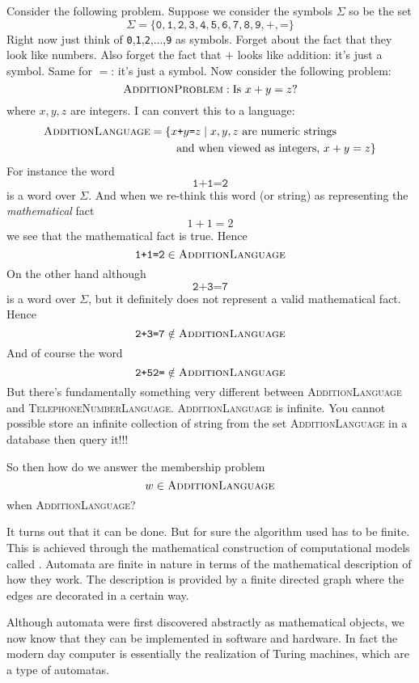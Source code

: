 Consider the following problem.
Suppose we consider the symbols $\Sigma$ so be the set
\[
\Sigma = \{\texttt{0},\texttt{1},\texttt{2},\texttt{3},\texttt{4},\texttt{5},\texttt{6},\texttt{7},\texttt{8},\texttt{9},\texttt{+},\texttt{=}\}
\]
Right now just think of
\verb!0!,\verb!1!,\verb!2!,...,\verb!9! as symbols.
Forget about the fact that they look like numbers.
Also forget the fact that $+$ looks like addition: it's just a symbol.
Same for $=$: it's just a symbol.
Now consider the following problem:
\[
\textsc{AdditionProblem}: \text{Is $x + y = z$?}
\]
where $x,y,z$ are integers.
I can convert this to a language:
\begin{align*}
  \textsc{AdditionLanguage}
  &= \{x\texttt{+}y\texttt{=}z \mid x,y,z \text{ are numeric strings} \\
  &\hspace{0.7cm}\text{ and when viewed as integers, } x + y = z \}
\end{align*}
For instance the word
\[
\texttt{1+1=2}
\]
is a word over $\Sigma$. And when we re-think this word (or string) as
representing the \textit{mathematical} fact
\[
1 + 1 = 2
\]
we see that the mathematical fact is true.
Hence
\[
\texttt{1+1=2} \in \textsc{AdditionLanguage}
\]
On the other hand although
\[
\texttt{2+3=7}
\]
is a word over $\Sigma$,
but it definitely does not represent a valid mathematical fact.
Hence
\[
\texttt{2+3=7} \notin \textsc{AdditionLanguage}
\]
And of course the word
\[
\texttt{2+52=} \notin \textsc{AdditionLanguage}
\]
But there's fundamentally something very different between
\textsc{AdditionLanguage} and
\textsc{TelephoneNumberLanguage}.
\textsc{AdditionLanguage} is infinite.
You cannot possible store an infinite collection of string
from the set \textsc{AdditionLanguage} in a database then query it!!!

So then how do we answer the membership problem
\[
w \in \textsc{AdditionLanguage}
\]
when \textsc{AdditionLanguage}?

It turns out that it can be done.
But for sure the algorithm used has to be finite.
This is achieved through the mathematical construction of
computational models called .
Automata are finite in nature in terms of the mathematical
description of how they work.
The description is provided by a finite directed graph
where the edges are decorated in a certain way.

Although automata were first discovered abstractly as mathematical objects,
we now know that they can be implemented in software and hardware.
In fact the modern day computer is essentially the realization of
Turing machines, which are a type of automatas.

